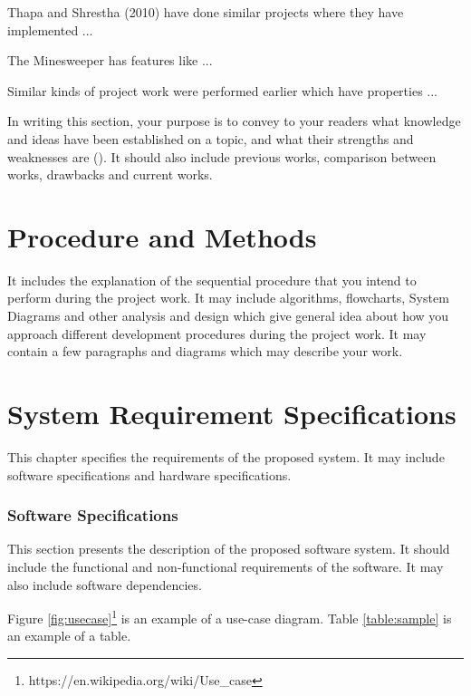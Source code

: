 \documentclass{projectreport}
\begin{document}
	
	Thapa and Shrestha (2010) have done similar projects where they have implemented ...
	
	The Minesweeper \cite{rai2012} has features like ...
	
	Similar kinds of project work were performed earlier which have properties ...
	
	
	
	In writing this section, your purpose is to convey to your readers what knowledge and ideas have been established on a topic, and what their strengths and weaknesses are (\cite{taylor2008literature}). It should also include previous works, comparison between works, drawbacks and current works.
	
	
	\chapter{ Procedure and Methods  }
	It includes the explanation of the sequential procedure that you intend to perform during the project work. It may include algorithms, flowcharts, System Diagrams and other analysis and design which give general idea about how you approach different development procedures during the project work. It may contain a few paragraphs and diagrams which may describe your work. 
	
	
	\chapter{System Requirement Specifications}
	
	This chapter specifies the requirements of the proposed system. It may include software specifications and hardware specifications.
	
	\subsection{Software Specifications}
	This section presents the description of the proposed software system. It should include the functional and non-functional requirements of the software. It may also include software dependencies.
	
	Figure \ref{fig:usecase}\footnote{https://en.wikipedia.org/wiki/Use\_case} is an example of a use-case diagram. Table \ref{table:sample} is an example of a table.
	
\end{document}
